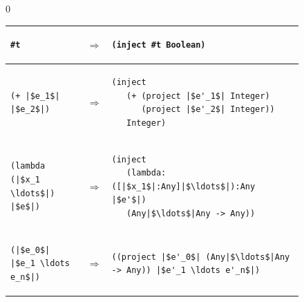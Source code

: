 \documentclass[7x10]{TimesAPriori_MIT}%
\def\racketEd{0}
\def\edition{1}
\numberwithin{theorem}{chapter}
\numberwithin{definition}{chapter}
\numberwithin{equation}{chapter}
\begin{document}
\begin{figure}[btp]
\centering
  \begin{tcolorbox}[colback=white]
{\if\edition\racketEd
\begin{tabular}{lll}
\begin{minipage}{0.27\textwidth}
\begin{lstlisting}
#t
\end{lstlisting}
\end{minipage}
&
$\Rightarrow$
&
\begin{minipage}{0.65\textwidth}
\begin{lstlisting}
(inject #t Boolean)
\end{lstlisting}
\end{minipage}
\\[2ex]\hline
\begin{minipage}{0.27\textwidth}
\begin{lstlisting}
(+ |$e_1$| |$e_2$|)
\end{lstlisting}
\end{minipage}
&
$\Rightarrow$
&
\begin{minipage}{0.65\textwidth}
\begin{lstlisting}
(inject
   (+ (project |$e'_1$| Integer)
      (project |$e'_2$| Integer))
   Integer)
\end{lstlisting}
\end{minipage}
\\[2ex]\hline
\begin{minipage}{0.27\textwidth}
\begin{lstlisting}
(lambda (|$x_1 \ldots$|) |$e$|)
\end{lstlisting}
\end{minipage}
&
$\Rightarrow$
&
\begin{minipage}{0.65\textwidth}
\begin{lstlisting}
(inject
   (lambda: ([|$x_1$|:Any]|$\ldots$|):Any |$e'$|)
   (Any|$\ldots$|Any -> Any))
\end{lstlisting}
\end{minipage}
\\[2ex]\hline
\begin{minipage}{0.27\textwidth}
\begin{lstlisting}
(|$e_0$| |$e_1 \ldots e_n$|)
\end{lstlisting}
\end{minipage}
&
$\Rightarrow$
&
\begin{minipage}{0.65\textwidth}
\begin{lstlisting}
((project |$e'_0$| (Any|$\ldots$|Any -> Any)) |$e'_1 \ldots e'_n$|)

\end{lstlisting}
\end{minipage}
\end{tabular}}
\end{tcolorbox}
\end{figure}
\end{document}
